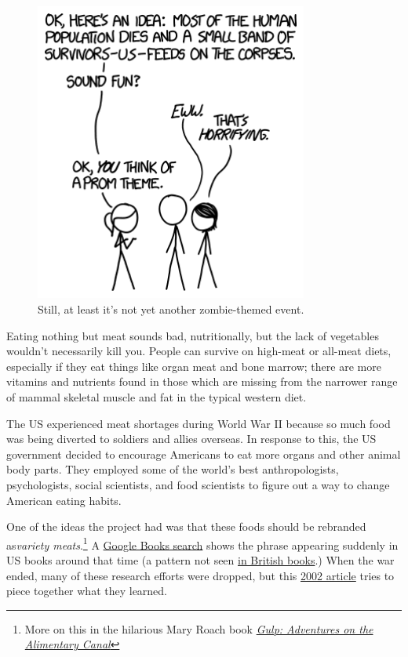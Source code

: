 {\begin{figure}[!htbp]
\centering
\includegraphics[scale=0.5, max width=0.8\textwidth]{imgs/a/105/proposal.png}
\caption{Still, at least it's not yet another zombie-themed event.}
\end{figure}

{Eating nothing but meat sounds bad, nutritionally, but the lack of vegetables wouldn't necessarily kill you. People can survive on high-meat or all-meat diets, especially if they eat things like organ meat and bone marrow; there are more vitamins and nutrients found in those which are missing from the narrower range of mammal skeletal muscle and fat in the typical western diet.}

{The US experienced meat shortages during World War II because so much food was being diverted to soldiers and allies overseas. In response to this, the US government decided to encourage Americans to eat more organs and other animal body parts. They employed some of the world's best anthropologists, psychologists, social scientists, and food scientists to figure out a way to change American eating habits.}

{One of the ideas the project had was that these foods should be rebranded as\emph{variety meats}.{\footnote{More on this in the hilarious Mary Roach book \emph{ \href{http://www.amazon.com/Gulp-Adventures-Alimentary-Mary-Roach/dp/0393081575}{Gulp: Adventures on the Alimentary Canal}} } } A \href{https://books.google.com/ngrams/graph?content=variety+meats&year\_start=1800&year\_end=2008&corpus=17&smoothing=3}{Google Books search} shows the phrase appearing suddenly in US books around that time (a pattern not seen \href{https://books.google.com/ngrams/graph?content=variety+meats&year\_start=1800&year\_end=2008&corpus=18&smoothing=3}{in British books}.) When the war ended, many of these research efforts were dropped, but this \href{https://books.google.com/ngrams/graph?content=variety+meats&year\_start=1800&year\_end=2008&corpus=15&smoothing=3}{2002 article} tries to piece together what they learned.}

}
